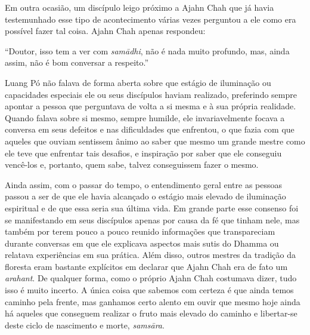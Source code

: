 Em outra ocasião, um discípulo leigo próximo a Ajahn Chah que já havia
testemunhado esse tipo de acontecimento várias vezes perguntou a ele
como era possível fazer tal coisa. Ajahn Chah apenas respondeu:

``Doutor, isso tem a ver com \emph{samādhi}, não é nada muito profundo,
mas, ainda assim, não é bom conversar a respeito.''

\enlargethispage{\baselineskip}

Luang Pó não falava de forma aberta sobre que estágio de iluminação ou
capacidades especiais ele ou seus discípulos haviam realizado,
preferindo sempre apontar a pessoa que perguntava de volta a si mesma e
à sua própria realidade. Quando falava sobre si mesmo, sempre humilde,
ele invariavelmente focava a conversa em seus defeitos e nas
dificuldades que enfrentou, o que fazia com que aqueles que ouviam
sentissem ânimo ao saber que mesmo um grande mestre como ele teve que
enfrentar tais desafios, e inspiração por saber que ele conseguiu
vencê-los e, portanto, quem sabe, talvez conseguissem fazer o mesmo.

Ainda assim, com o passar do tempo, o entendimento geral entre as
pessoas passou a ser de que ele havia alcançado o estágio mais elevado
de iluminação espiritual e de que essa seria sua última vida. Em grande
parte esse consenso foi se manifestando em seus discípulos apenas por
causa da fé que tinham nele, mas também por terem pouco a pouco reunido
informações que transpareciam durante conversas em que ele explicava
aspectos mais sutis do Dhamma ou relatava experiências em sua prática.
Além disso, outros mestres da tradição da floresta eram bastante
explícitos em declarar que Ajahn Chah era de fato um \emph{arahant}. De
qualquer forma, como o próprio Ajahn Chah costumava dizer, tudo isso é
muito incerto. A única coisa que sabemos com certeza é que ainda temos
caminho pela frente, mas ganhamos certo alento em ouvir que mesmo hoje
ainda há aqueles que conseguem realizar o fruto mais elevado do caminho
e libertar-se deste ciclo de nascimento e morte, \emph{samsāra}.

